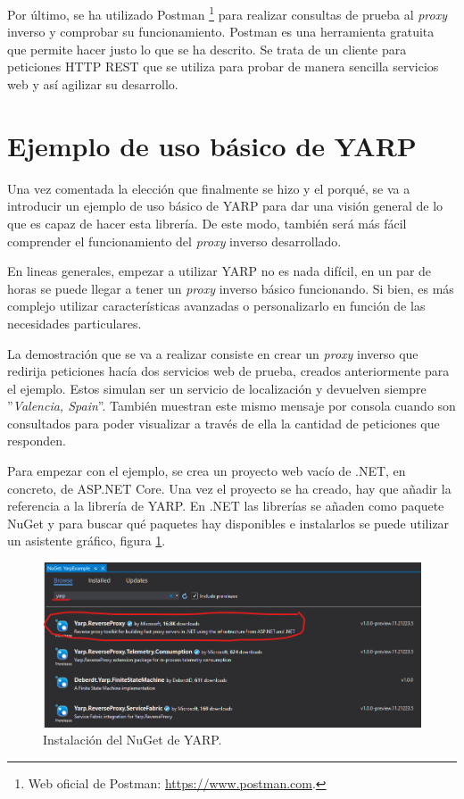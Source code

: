 \documentclass[11pt,spanish,listoffigures]{tfgetsinf}
\begin{document}
Por último, se ha utilizado Postman \footnote{Web oficial de Postman: \url{https://www.postman.com}.} para realizar consultas de prueba al \emph{proxy} inverso y comprobar su funcionamiento. Postman es una herramienta gratuita que permite hacer justo lo que se ha descrito. Se trata de un cliente para peticiones HTTP REST que se utiliza para probar de manera sencilla servicios web y así agilizar su desarrollo.


	\section{Ejemplo de uso básico de YARP} \label{ejemploUsoYARP}

Una vez comentada la elección que finalmente se hizo y el porqué, se va a introducir un ejemplo de uso básico de YARP para dar una visión general de lo que es capaz de hacer esta librería. De este modo, también será más fácil comprender el funcionamiento del \emph{proxy} inverso desarrollado.

En lineas generales, empezar a utilizar YARP no es nada difícil, en un par de horas se puede llegar a tener un \emph{proxy} inverso básico funcionando. Si bien, es más complejo utilizar características avanzadas o personalizarlo en función de las necesidades particulares.

La demostración que se va a realizar consiste en crear un \emph{proxy} inverso que redirija peticiones hacía dos servicios web de prueba, creados anteriormente para el ejemplo. Estos simulan ser un servicio de localización y devuelven siempre ''\emph{Valencia, Spain}''. También muestran este mismo mensaje por consola cuando son consultados para poder visualizar a través de ella la cantidad de peticiones que responden.

Para empezar con el ejemplo, se crea un proyecto web vacío de .NET, en concreto, de ASP.NET Core. Una vez el proyecto se ha creado, hay que añadir la referencia a la librería de YARP. En .NET las librerías se añaden como paquete NuGet \cite{NuGet} y para buscar qué paquetes hay disponibles e instalarlos se puede utilizar un asistente gráfico, figura \ref{ejemploYARP_instalacionNuGet}.

\begin{figure}[ht]
\centering
\includegraphics[width=1\textwidth]{imagenes/ejemploYARP/instalacionNuGet}
\caption{Instalación del NuGet de YARP.}
	\label{ejemploYARP_instalacionNuGet}
\end{figure}
\end{document}
